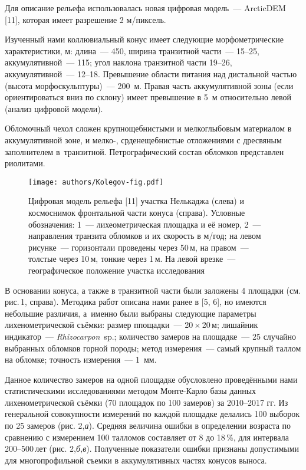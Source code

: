 Для описание рельефа использовалась новая цифровая модель~--- ArcticDEM [11], которая имеет разрешение 2 м/пиксель.

Изученный нами коллювиальный конус имеет следующие морфометрические характеристики, м: длина~---  450, ширина транзитной части~---  15--25, аккумулятивной~--- 115; угол наклона транзитной части 19--26\dg, аккумулятивной~--- 12--18\dg. Превышение области питания над дистальной частью (высота морфоскульптуры)~--- 200~м. Правая часть аккумулятивной зоны (если ориентироваться вниз по склону) имеет превышение в 5~м относительно левой (анализ цифровой модели).

Обломочный чехол сложен крупнощебнистыми и мелкоглыбовым материалом в аккумулятивной зоне, и мелко-, срденещебнистые отложениями с дресвяным заполнителем в~транзитной. Петрографический состав обломков представлен риолитами.

\begin{figure}[H]
  \centering
  \texttt{[image: authors/Kolegov-fig.pdf]}
  \caption{Цифровая модель рельефа [11] участка Нелькаджа (слева) и космоснимок фронтальной части конуса (справа). Условные обозначения: 1~--- лихеометрическая площадка и её номер, 2~--- направления транзита обломков и их скорость в м/год; на левом рисунке~--- горизонтали проведены через 50\,м, на правом~--- толстые через 10\,м, тонкие через 1\,м. На левой врезке~--- географическое положение участка исследования}
  \label{fig:kolegov-fig}
\end{figure}

В основании конуса, а также в транзитной части были заложены 4 площадки (см. рис.\,1, справа). Методика работ описана нами ранее в [5, 6], но имеются небольшие различия, а~именно были выбраны следующие параметры лихенометрической съёмки:  размер ппощадки~--- 20\,$\times$\,20\,м; лишайник индикатор~--- \textit{Rhizocarpon}~sp.; количество замеров на площадке~--- 25 случайно выбранных обломков горной породы; метод измерения~--- самый крупный таллом на обломке; точность измерения~--- 1~мм.

Данное количество замеров на одной площадке обусловлено проведёнными нами статистическими исследованиями методом Монте-Карло базы данных лихенометрической съёмки (70 площадок по 100 замеров) за 2010--2017 гг. Из генеральной совокупности измерений по каждой площадке делались 100 выборок по 25 замеров (рис. 2,\textit{а}). Средняя величина ошибки в определении возраста по сравнению с измерением 100 талломов составляет от 8 до 18\,\%, для интервала 200--500\,лет (рис. 2,\textit{б,в}).  Полученные показатели ошибки признаны допустимыми для многопрофильной съемки в аккумулятивных частях конусов выноса.



